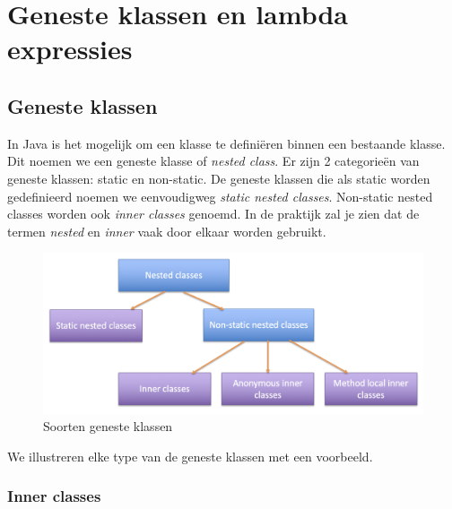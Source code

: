 \documentclass{tstextbook}
\begin{document}
\chapter{Geneste klassen en lambda expressies}

\section{Geneste klassen}

In Java is het mogelijk om een klasse te defini\"eren binnen een bestaande klasse. Dit noemen we een geneste klasse of \textit{nested class}. Er zijn 2 categorie\"en van geneste klassen: static en non-static.
De geneste klassen die als static worden gedefinieerd noemen we eenvoudigweg \textit{static nested classes}. Non-static nested classes worden ook \textit{inner classes} genoemd. In de praktijk zal je zien dat de termen \textit{nested} en \textit{inner} vaak door elkaar worden gebruikt.

\begin{figure}[H]
  \includegraphics[width=\linewidth]{images/h5/nested-classes.png}
  \caption{Soorten geneste klassen}
  \label{fig:nested_classes}
\end{figure}

We illustreren elke type van de geneste klassen met een voorbeeld.


\subsection{Inner classes}
\end{document}
